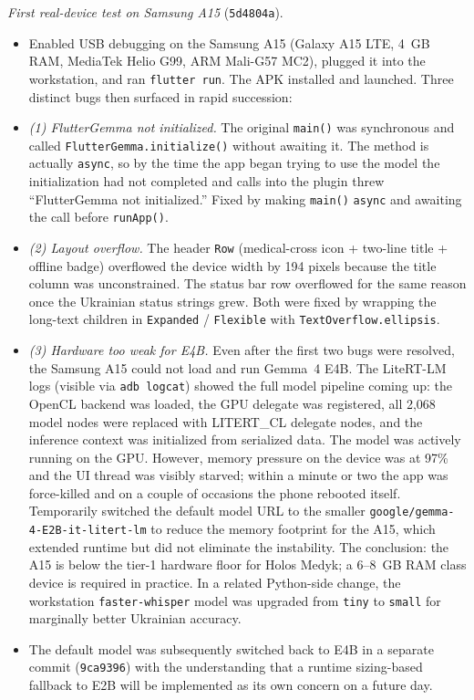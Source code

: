 \documentclass{article}
\theoremstyle{plain}
\theoremstyle{definition}
\theoremstyle{remark}
\begin{document}
\textit{First real-device test on Samsung A15} (\texttt{5d4804a}).
\begin{itemize}
\item Enabled USB debugging on the Samsung A15 (Galaxy A15 LTE, 4~GB RAM, MediaTek Helio G99, ARM Mali-G57 MC2), plugged it into the workstation, and ran \texttt{flutter run}. The APK installed and launched. Three distinct bugs then surfaced in rapid succession:
\item \textit{(1) FlutterGemma not initialized.} The original \texttt{main()} was synchronous and called \texttt{FlutterGemma.initialize()} without awaiting it. The method is actually \texttt{async}, so by the time the app began trying to use the model the initialization had not completed and calls into the plugin threw ``FlutterGemma not initialized.'' Fixed by making \texttt{main()} \texttt{async} and awaiting the call before \texttt{runApp()}.
\item \textit{(2) Layout overflow.} The header \texttt{Row} (medical-cross icon + two-line title + offline badge) overflowed the device width by 194 pixels because the title column was unconstrained. The status bar row overflowed for the same reason once the Ukrainian status strings grew. Both were fixed by wrapping the long-text children in \texttt{Expanded} / \texttt{Flexible} with \texttt{TextOverflow.ellipsis}.
\item \textit{(3) Hardware too weak for E4B.} Even after the first two bugs were resolved, the Samsung A15 could not load and run Gemma~4 E4B. The LiteRT-LM logs (visible via \texttt{adb logcat}) showed the full model pipeline coming up: the OpenCL backend was loaded, the GPU delegate was registered, all 2{,}068 model nodes were replaced with LITERT\_CL delegate nodes, and the inference context was initialized from serialized data. The model was actively running on the GPU. However, memory pressure on the device was at 97\% and the UI thread was visibly starved; within a minute or two the app was force-killed and on a couple of occasions the phone rebooted itself. Temporarily switched the default model URL to the smaller \texttt{google/gemma-4-E2B-it-litert-lm} to reduce the memory footprint for the A15, which extended runtime but did not eliminate the instability. The conclusion: the A15 is below the tier-1 hardware floor for Holos Medyk; a 6--8~GB RAM class device is required in practice. In a related Python-side change, the workstation \texttt{faster-whisper} model was upgraded from \texttt{tiny} to \texttt{small} for marginally better Ukrainian accuracy.
\item The default model was subsequently switched back to E4B in a separate commit (\texttt{9ca9396}) with the understanding that a runtime sizing-based fallback to E2B will be implemented as its own concern on a future day.
\end{itemize}
\end{document}
